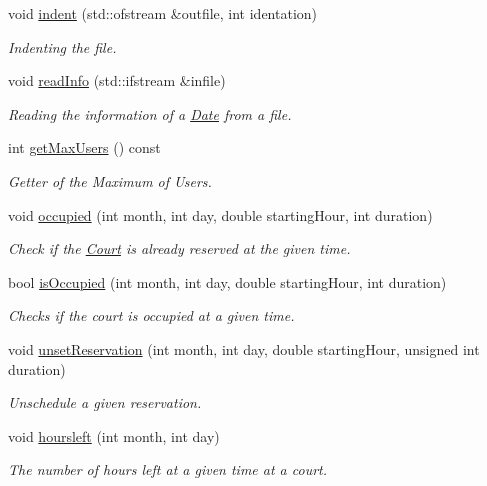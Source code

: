 \begin{DoxyCompactItemize}
void \mbox{\hyperlink{class_court_ae08f3e2f1119073fffc251fc1e725550}{indent}} (std\+::ofstream \&outfile, int identation)
\begin{DoxyCompactList}\small\item\em Indenting the file. \end{DoxyCompactList}\item 
void \mbox{\hyperlink{class_court_a2d801d3edd9d0280ef0420b131e07f2e}{read\+Info}} (std\+::ifstream \&infile)
\begin{DoxyCompactList}\small\item\em Reading the information of a \mbox{\hyperlink{class_date}{Date}} from a file. \end{DoxyCompactList}\item 
int \mbox{\hyperlink{class_court_a9992ef2a5d2ee81e8cc7f24f8c917f31}{get\+Max\+Users}} () const
\begin{DoxyCompactList}\small\item\em Getter of the Maximum of Users. \end{DoxyCompactList}\item 
void \mbox{\hyperlink{class_court_abb97f1c2df77bd02e788ac7d4709eaa8}{occupied}} (int month, int day, double starting\+Hour, int duration)
\begin{DoxyCompactList}\small\item\em Check if the \mbox{\hyperlink{class_court}{Court}} is already reserved at the given time. \end{DoxyCompactList}\item 
bool \mbox{\hyperlink{class_court_ae4536a06bcc2aec8a144d134ae64f2e6}{is\+Occupied}} (int month, int day, double starting\+Hour, int duration)
\begin{DoxyCompactList}\small\item\em Checks if the court is occupied at a given time. \end{DoxyCompactList}\item 
void \mbox{\hyperlink{class_court_a5041b8a1dd8463f4b184497a63f718f0}{unset\+Reservation}} (int month, int day, double starting\+Hour, unsigned int duration)
\begin{DoxyCompactList}\small\item\em Unschedule a given reservation. \end{DoxyCompactList}\item 
void \mbox{\hyperlink{class_court_abb67c98e97c13d7eb9e49622a2e12aff}{hoursleft}} (int month, int day)
\begin{DoxyCompactList}\small\item\em The number of hours left at a given time at a court. \end{DoxyCompactList}\end{DoxyCompactItemize}


